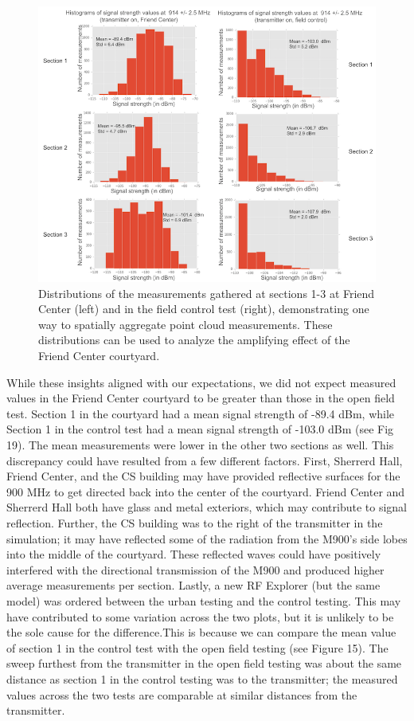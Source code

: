 \documentclass[pageno]{jpaper}
\begin{document}
\begin{figure}
	\caption[Distributions of the measurements gathered at sections 1-3 at Friend Center and in the field control test]{Distributions of the measurements gathered at sections 1-3 at Friend Center (left) and in the field control test (right), demonstrating one way to spatially aggregate point cloud measurements. These distributions can be used to analyze the amplifying effect of the Friend Center courtyard. }
	\centerline{\includegraphics{friend_5}}
\end{figure}

While these insights aligned with our expectations, we did not expect measured values in the Friend Center courtyard to be greater than those in the open field test. Section 1 in the courtyard had a mean signal strength of -89.4 dBm, while Section 1 in the control test had a mean signal strength of -103.0 dBm (see Fig 19). The mean measurements were lower in the other two sections as well. This discrepancy could have resulted from a few different factors. First, Sherrerd Hall, Friend Center, and the CS building may have provided reflective surfaces for the 900 MHz to get directed back into the center of the courtyard. Friend Center and Sherrerd Hall both have glass and metal exteriors, which may contribute to signal reflection\cite{reflections}. Further, the CS building was to the right of the transmitter in the simulation; it may have reflected some of the radiation from the M900's side lobes into the middle of the courtyard. These reflected waves could have positively interfered with the directional transmission of the M900 and produced higher average measurements per section. Lastly, a new RF Explorer (but the same model) was ordered between the urban testing and the control testing. This may have contributed to some variation across the two plots, but it is unlikely to be the sole cause for the difference.This is because we can compare the mean value of section 1 in the control test with the open field testing (see Figure 15). The sweep furthest from the transmitter in the open field testing was about the same distance as section 1 in the control testing was to the transmitter; the measured values across the two tests are comparable at similar distances from the transmitter.
\end{document}
